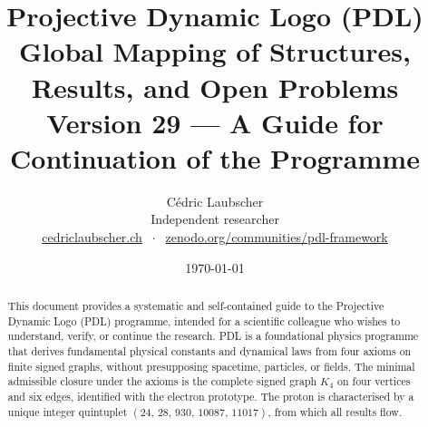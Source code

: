\documentclass[11pt,a4paper]{article}
\title{Projective Dynamic Logo (PDL)\\[4pt]
\large Global Mapping of Structures, Results, and Open Problems\\[2pt]
\normalsize Version 29 --- A Guide for Continuation of the Programme}
\author{C\'edric Laubscher\\[4pt]
\small Independent researcher\\
\small \href{https://cedriclaubscher.ch}{cedriclaubscher.ch}
$\;\cdot\;$
\small \href{https://zenodo.org/communities/pdl-framework/}{zenodo.org/communities/pdl-framework}}
\date{\today}
\theoremstyle{plain}
\theoremstyle{definition}
\theoremstyle{remark}
\newcommand{\Kfour}{K_4}
\newcommand{\quintuplet}{(24,\,28,\,930,\,10087,\,11017)}
\begin{document}
\maketitle
\setcounter{tocdepth}{2}

\begin{abstract}
This document provides a systematic and self-contained guide to the Projective Dynamic Logo (PDL) programme, intended for a scientific colleague who wishes to understand, verify, or continue the research. PDL is a foundational physics programme that derives fundamental physical constants and dynamical laws from four axioms on finite signed graphs, without presupposing spacetime, particles, or fields. The minimal admissible closure under the axioms is the complete signed graph $\Kfour$ on four vertices and six edges, identified with the electron prototype. The proton is characterised by a unique integer quintuplet $\quintuplet$, from which all results flow.


\end{abstract}
\end{document}

